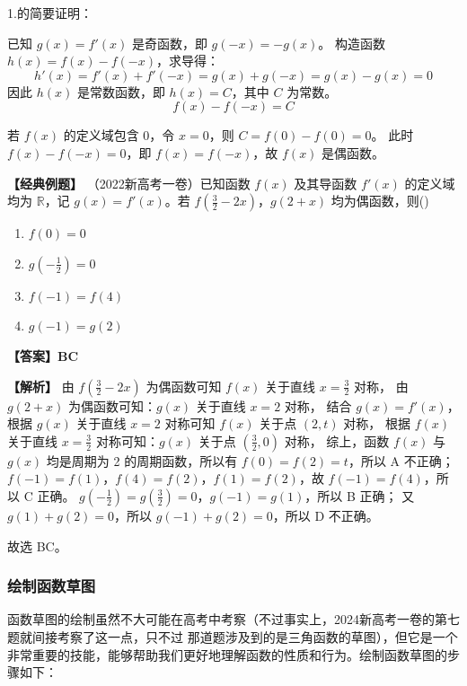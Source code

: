\documentclass{article}
\begin{document}
1.的简要证明：

已知 \(g(x) = f'(x)\) 是奇函数，即 \(g(-x) = -g(x)\)。
构造函数 \(h(x) = f(x) - f(-x)\)，求导得：
\[
h'(x) = f'(x) + f'(-x) = g(x) + g(-x) = g(x) - g(x) = 0
\]
因此 \(h(x)\) 是常数函数，即 \(h(x) = C\)，其中 \(C\) 为常数。
\[
f(x) - f(-x) = C
\]

若 \(f(x)\) 的定义域包含 \(0\)，令 \(x = 0\)，则 \(C = f(0) - f(0) = 0\)。
此时 \(f(x) - f(-x) = 0\)，即 \(f(x) = f(-x)\)，故 \(f(x)\) 是偶函数。
\vspace{2\baselineskip}

\noindent \textbf{【经典例题】} （2022新高考一卷）已知函数 \(f(x)\) 及其导函数 \(f'(x)\) 的定义域均为 \(\mathbb{R}\)，记 \(g(x) = f'(x)\)。若 \(f\left(\frac{3}{2}-2x\right)\)，\(g(2+x)\) 均为偶函数，则(\;\;\;)

\begin{enumerate}
    \item[A.] \(f(0) = 0\)
    \item[B.] \(g\left(-\frac{1}{2}\right) = 0\)
    \item[C.] \(f(-1) = f(4)\)
    \item[D.] \(g(-1) = g(2)\)
\end{enumerate}

\noindent \textbf{【答案】BC}

\noindent \textbf{【解析】}
由 \(f\left(\frac{3}{2}-2x\right)\) 为偶函数可知 \(f(x)\) 关于直线 \(x = \frac{3}{2}\) 对称，
由 \(g(2+x)\) 为偶函数可知：\(g(x)\) 关于直线 \(x = 2\) 对称，
结合 \(g(x) = f'(x)\)，根据 \(g(x)\) 关于直线 \(x = 2\) 对称可知 \(f(x)\) 关于点 \((2,t)\) 对称，
根据 \(f(x)\) 关于直线 \(x = \frac{3}{2}\) 对称可知：\(g(x)\) 关于点 \(\left(\frac{3}{2},0\right)\) 对称，
综上，函数 \(f(x)\) 与 \(g(x)\) 均是周期为 2 的周期函数，所以有 \(f(0) = f(2) = t\)，所以 A 不正确；
\(f(-1) = f(1)\)，\(f(4) = f(2)\)，\(f(1) = f(2)\)，故 \(f(-1) = f(4)\)，所以 C 正确。
\(g\left(-\frac{1}{2}\right) = g\left(\frac{3}{2}\right) = 0\)，\(g(-1) = g(1)\)，所以 B 正确；
又 \(g(1) + g(2) = 0\)，所以 \(g(-1) + g(2) = 0\)，所以 D 不正确。

故选 BC。

\subsubsection{绘制函数草图}

函数草图的绘制虽然不大可能在高考中考察（不过事实上，2024新高考一卷的第七题就间接考察了这一点，只不过
那道题涉及到的是三角函数的草图），但它是一个非常重要的技能，能够帮助我们更好地理解函数的性质和行为。绘制函数草图的步骤如下：
\end{document}
